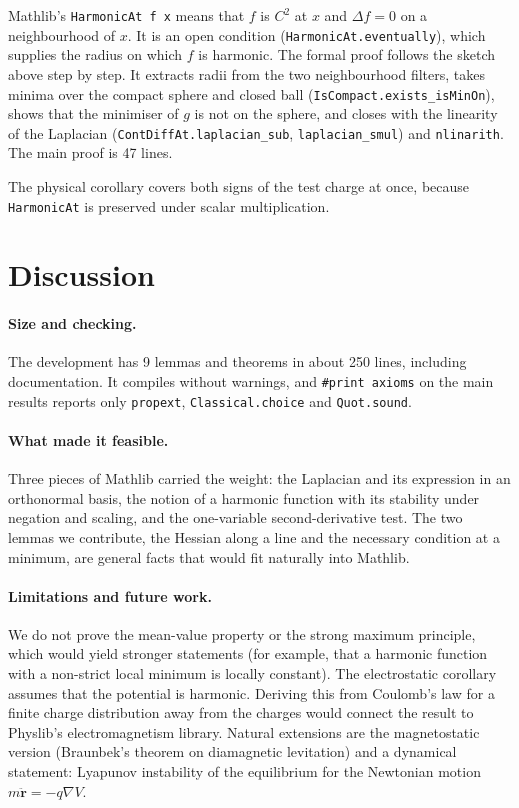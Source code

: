 \documentclass[11pt]{article}
\theoremstyle{remark}
\begin{document}
Mathlib's \texttt{HarmonicAt f x} means that $f$ is $C^2$ at $x$ and $\Delta f=0$ on a
neighbourhood of $x$. It is an open condition (\texttt{HarmonicAt.eventually}), which supplies the
radius on which $f$ is harmonic. The formal proof follows the sketch above step by step. It
extracts radii from the two neighbourhood filters, takes minima over the compact sphere and closed
ball (\texttt{IsCompact.exists\_isMinOn}), shows that the minimiser of $g$ is not on the sphere,
and closes with the linearity of the Laplacian (\texttt{ContDiffAt.laplacian\_sub},
\texttt{laplacian\_smul}) and \texttt{nlinarith}. The main proof is 47 lines.

The physical corollary covers both signs of the test charge at once, because
\texttt{HarmonicAt} is preserved under scalar multiplication.

\section{Discussion}

\paragraph{Size and checking.} The development has 9 lemmas and theorems in about 250 lines,
including documentation. It compiles without warnings, and \texttt{\#print axioms} on the main
results reports only \texttt{propext}, \texttt{Classical.choice} and \texttt{Quot.sound}.

\paragraph{What made it feasible.} Three pieces of Mathlib carried the weight: the Laplacian and
its expression in an orthonormal basis, the notion of a harmonic function with its stability under
negation and scaling, and the one-variable second-derivative test. The two lemmas we contribute,
the Hessian along a line and the necessary condition at a minimum, are general facts that would
fit naturally into Mathlib.

\paragraph{Limitations and future work.} We do not prove the mean-value property or the strong
maximum principle, which would yield stronger statements (for example, that a harmonic function
with a non-strict local minimum is locally constant). The electrostatic corollary assumes that the
potential is harmonic. Deriving this from Coulomb's law for a finite charge distribution away from
the charges would connect the result to Physlib's electromagnetism library. Natural extensions are
the magnetostatic version (Braunbek's theorem on diamagnetic levitation) and a dynamical
statement: Lyapunov instability of the equilibrium for the Newtonian motion $m\ddot{\mathbf r}=-q\nabla V$.
\end{document}
